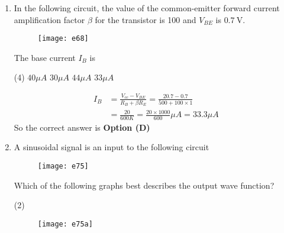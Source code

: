 \begin{enumerate}
	From these measurements it may be inferred that the
	{}
\begin{figure}[H]
\centering
\texttt{[image: e63]}
\end{figure}
\begin{tasks}(2)
\task[\textbf{A.}] Base is open internally
\task[\textbf{B.}] Emitter is open internally
\task[\textbf{C.}] Collector resistor is open
\task[\textbf{D.}] Base resistor is open
\end{tasks}
\begin{answer}
So the correct answer is \textbf{Option (D)}
\end{answer}
	\item In the following circuit, the value of the common-emitter forward current amplification factor $\beta$ for the transistor is 100 and $V_{B E}$ is $0.7 \mathrm{~V}$.\\
	\begin{figure}[H]
		\centering
		\texttt{[image: e68]}
	\end{figure}
	The base current $I_{B}$ is
{	}
\begin{tasks}(4)
\task[\textbf{A.}] $40 \mu A$
\task[\textbf{B.}] $30 \mu A$
\task[\textbf{C.}] $44 \mu A$
\task[\textbf{D.}] $33 \mu A$
\end{tasks}
\begin{answer}
\begin{align*}
I_{B}&=\frac{V_{c c}-V_{B E}}{R_{B}+\beta R_{E}}=\frac{20.7-0.7}{500+100 \times 1}\\&=\frac{20}{600 K}=\frac{20 \times 1000}{600} \mu A=33.3 \mu A
\end{align*}
So the correct answer is \textbf{Option (D)}
\end{answer}
	\item A sinusoidal signal is an input to the following circuit\\
	\begin{figure}[H]
		\centering
		\texttt{[image: e75]}
	\end{figure}
	Which of the following graphs best describes the output wave function?
{	}
\begin{tasks}(2)
\task[\textbf{A.}] \begin{figure}[H]
	\centering
	\texttt{[image: e75a]}
\end{figure}
\task[\textbf{B.}] \begin{figure}[H]
	\centering

\end{figure}
\end{tasks}
\end{enumerate}
